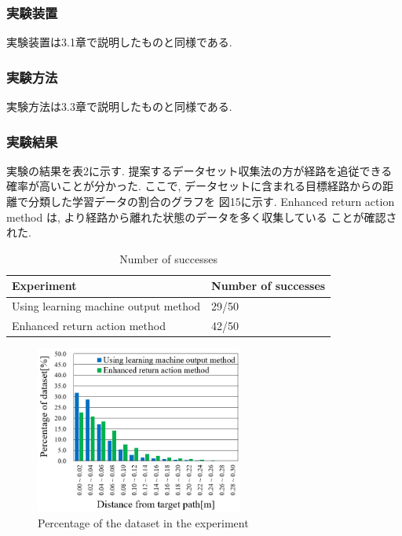 \documentclass{jarticle}
\begin{document}
\subsubsection{実験装置}
実験装置は3.1章で説明したものと同様である.
\vspace*{2.5mm}
\subsubsection{実験方法}
実験方法は3.3章で説明したものと同様である.
\vspace*{2.5mm}
\subsubsection{実験結果}
実験の結果を表2に示す. 提案するデータセット収集法の方が経路を追従できる確率が高いことが分かった.
ここで, データセットに含まれる目標経路からの距離で分類した学習データの割合のグラフを
図15に示す. Enhanced return action method は, より経路から離れた状態のデータを多く収集している
ことが確認された.


\begin{table}[h!]
  \caption{Number of successes} \vspace*{2mm}\hspace*{-10mm}
    \begin{tabular}{|l|l|}
      \hline\hline
      Experiment & Number of successes \\
      \hline\hline
      Using learning machine output method & 29/50 \\
      Enhanced return action method & 42/50\\
      \hline
    \end{tabular}
\end {table}


\begin{figure}[h!]\vspace*{-5mm}
  \centering
   \includegraphics[height=55mm]{./figs/tes2.png}
   \caption{Percentage of the dataset in the experiment}
\end{figure}
\end{document}
